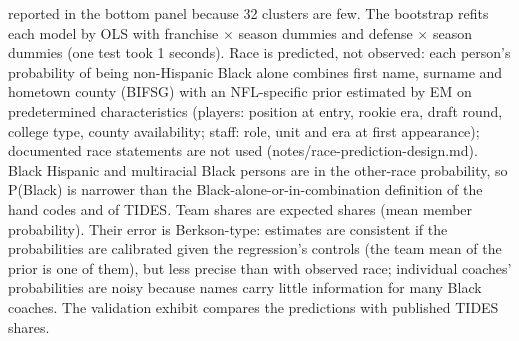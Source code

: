 {reported in the bottom panel because 32 clusters are few. The bootstrap refits each model by OLS with franchise $\times$ season dummies and defense $\times$ season dummies (one test took 1 seconds). Race is predicted, not observed: each person's probability of being non-Hispanic Black alone combines first name, surname and hometown county (BIFSG) with an NFL-specific prior estimated by EM on predetermined characteristics (players: position at entry, rookie era, draft round, college type, county availability; staff: role, unit and era at first appearance); documented race statements are not used (notes/race-prediction-design.md). Black Hispanic and multiracial Black persons are in the other-race probability, so P(Black) is narrower than the Black-alone-or-in-combination definition of the hand codes and of TIDES. Team shares are expected shares (mean member probability). Their error is Berkson-type: estimates are consistent if the probabilities are calibrated given the regression's controls (the team mean of the prior is one of them), but less precise than with observed race; individual coaches' probabilities are noisy because names carry little information for many Black coaches. The validation exhibit compares the predictions with published TIDES shares.
\par}

